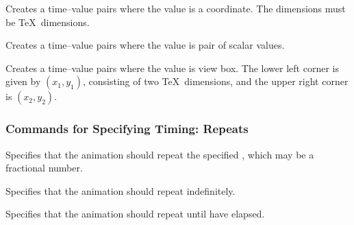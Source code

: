 \begin{command}{\pgfsys@animation@val@translate{}}
  Creates a time--value pairs where the value is a coordinate. The
  dimensions must be \TeX\ dimensions.
\end{command}

\begin{command}{\pgfsys@animation@val@scale{}}
  Creates a time--value pairs where the value is pair of scalar values.
\end{command}

\begin{command}{\pgfsys@animation@val@viewbox{}}
  Creates a time--value pairs where the value is view box. The lower
  left corner is given by $(x_1,y_1)$, consisting of two \TeX\
  dimensions, and the upper right corner is $(x_2,y_2)$.
\end{command}



\subsubsection{Commands for Specifying Timing: Repeats}


\begin{command}{\pgfsys@animation@repeat{}}
  Specifies that the animation should repeat the specified
  , which may be a fractional number.
\begin{codeexample}[width=2cm]
\end{codeexample}
\end{command}

\begin{command}{\pgfsys@animation@repeat@indefinite}
  Specifies that the animation should repeat indefinitely.
\begin{codeexample}[width=2cm]
\end{codeexample}
\end{command}

\begin{command}{\pgfsys@animation@repeat@dur{}}
  Specifies that the animation should repeat until  have
  elapsed. 
\begin{codeexample}[width=2cm]
\end{codeexample}
\end{command}




